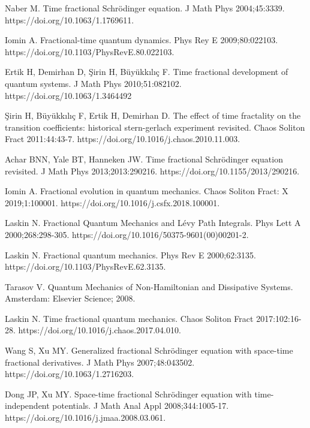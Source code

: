 \documentclass[
showpacs,  %
showkeys,  %
aps,       %
amsthm,    %
amsmath,   %
amsfonts,  %
amssymb    %
]{revtex4-1}          %
\begin{document}
\begin{thebibliography}{}

Naber M. Time fractional Schr\"{o}dinger equation. J Math Phys 2004;45:3339. https://doi.org/10.1063/1.1769611.

Iomin A. Fractional-time quantum dynamics. Phys Rey E 2009;80:022103. https://doi.org/10.1103/PhysRevE.80.022103.

Ertik H, Demirhan D, \c{S}irin H, B\"{u}y\"{u}kk{\i}l{\i}\c{c} F. Time fractional development of quantum systems. J Math Phys 2010;51:082102. https://doi.org/10.1063/1.3464492

\c{S}irin H, B\"{u}y\"{u}kk{\i}l{\i}\c{c} F, Ertik H, Demirhan D. The effect of time fractality on the transition coefficients: historical stern-gerlach experiment revisited. Chaos Soliton Fract 2011:44:43-7.  https://doi.org/10.1016/j.chaos.2010.11.003.

Achar BNN, Yale BT, Hanneken JW. Time fractional Schr\"{o}dinger equation revisited. J Math Phys 2013;2013:290216. https://doi.org/10.1155/2013/290216.

Iomin A. Fractional evolution in quantum mechanics. Chaos Soliton Fract: X 2019;1:100001. https://doi.org/10.1016/j.csfx.2018.100001.

Laskin N. Fractional Quantum Mechanics and L\'{e}vy Path Integrals. Phys Lett A 2000;268:298-305. https://doi.org/10.1016/50375-9601(00)00201-2.

Laskin N. Fractional quantum mechanics. Phys Rev E 2000;62:3135. https://doi.org/10.1103/PhysRevE.62.3135.

Tarasov V. Quantum Mechanics of Non-Hamiltonian and Dissipative Systems. Amsterdam: Elsevier Science; 2008.

Laskin N. Time fractional quantum mechanics. Chaos Soliton Fract 2017:102:16-28. https://doi.org/10.1016/j.chaos.2017.04.010.

Wang S, Xu MY. Generalized fractional Schr\"{o}dinger equation with space-time fractional derivatives. J Math Phys 2007;48:043502. https://doi.org/10.1063/1.2716203.

Dong JP, Xu MY. Space-time fractional Schr\"{o}dinger equation with time-independent potentials. J Math Anal Appl 2008;344:1005-17. https://doi.org/10.1016/j.jmaa.2008.03.061.


\end{thebibliography}
\end{document}
